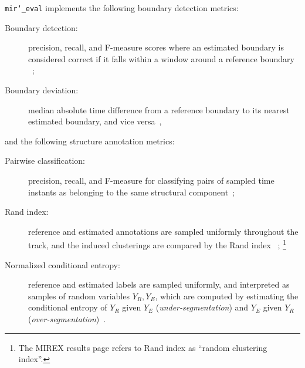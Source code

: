 \documentclass{article}
\def\mireval{\texttt{mir\char`_eval}}
\begin{document}
\mireval{} implements the following boundary detection metrics:
\begin{description}
\item[Boundary detection:] precision, recall, and F-measure scores where an estimated boundary is considered correct if it falls within a window around a reference boundary ~\cite{turnbull2007supervised};
\item[Boundary deviation:] median absolute time difference from a reference boundary to its nearest estimated boundary, and vice versa~\cite{turnbull2007supervised},
\end{description}
and the following structure annotation metrics:
\begin{description}
\item[Pairwise classification:] precision, recall, and F-measure for classifying pairs of sampled time instants as belonging to the same structural component~\cite{levy2008structural};
\item[Rand index:] reference and estimated annotations are sampled uniformly throughout the track, and the induced clusterings are compared by the Rand index ~\cite{rand1971objective};
\footnote{The MIREX results page refers to Rand index as ``random clustering index''.}
\item[Normalized conditional entropy:] reference and estimated labels are sampled uniformly, and interpreted as samples of random variables $Y_R, Y_E$, which are computed by estimating the conditional entropy of $Y_R$ given $Y_E$ (\emph{under-segmentation}) and $Y_E$ given $Y_R$  (\emph{over-segmentation})~\cite{lukashevich2008towards}.
\end{description}
\end{document}
